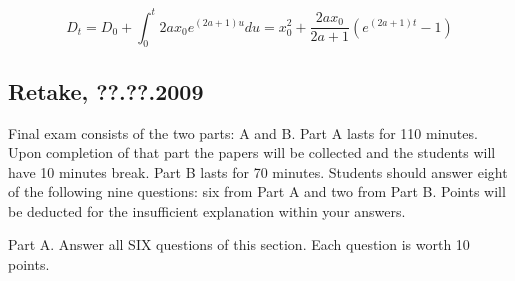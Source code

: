 \documentclass[12pt, a4paper]{article}
\begin{document}
\begin{enumerate}
\[
D_t=D_0+\int_{0}^{t} 2a x_0 e^{(2a+1)u }du= x_0^2+\frac{2ax_0}{2a+1}(e^{(2a+1)t}-1)
\]

\end{enumerate}

\subsection{Retake, ??.??.2009}

Final exam consists of the two parts: A and B. Part A lasts for 110 minutes.
Upon completion of that part the papers will be collected and the students will have 10 minutes break.
Part B lasts for 70 minutes.
Students should answer eight of the following nine questions: six from Part A  and two from Part B.
Points will be deducted for the insufficient explanation within your answers.

Part A.
Answer all SIX questions of this section. Each question is worth 10 points.
\end{document}
